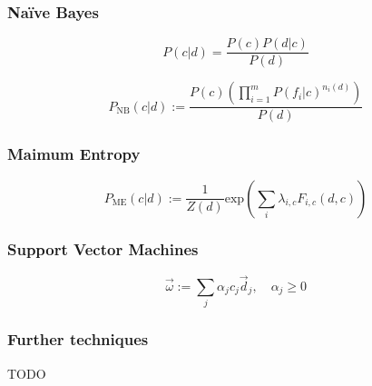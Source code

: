 \subsubsection*{Na\"ive Bayes}



\begin{equation*}
P(c \vert d) = \frac{P(c)P(d \vert c)}{P(d)}
\end{equation*}

\begin{equation*}
P_{\mathrm{NB}}(c \vert d) := \frac{P(c)(\prod^{m}_{i=1}P(f_i \vert c)^{n_i(d)})}{P(d)}
\end{equation*}

\subsubsection*{Maimum Entropy}

\begin{equation*}
P_{\mathrm{ME}}(c \vert d) := \frac{1}{Z(d)}\mathrm{exp}\left( \sum_{i} \lambda_{i,c} F_{i,c}(d,c) \right)
\end{equation*}

\subsubsection*{Support Vector Machines}

\begin{equation*}
\vec{\omega} := \sum_j \alpha_j c_j \vec{d}_j,\quad \alpha_j \geq 0
\end{equation*}

\subsubsection*{Further techniques}

TODO